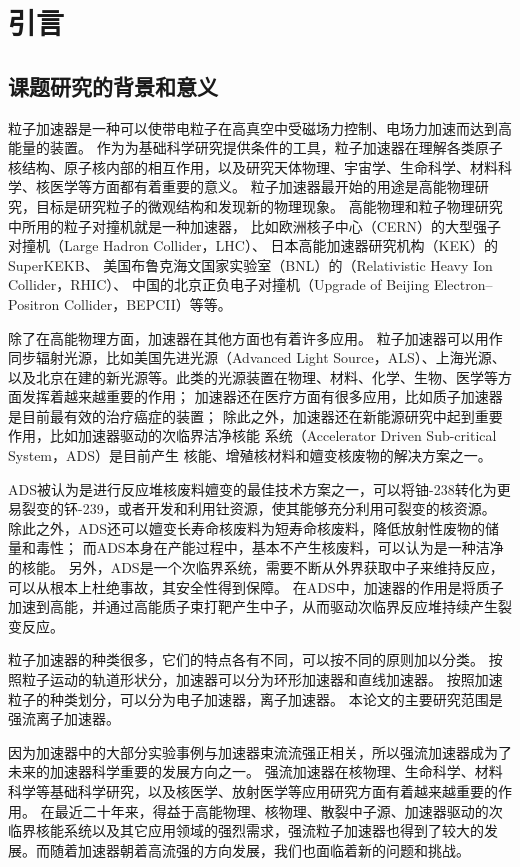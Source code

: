 
\chapter{引言}
\label{chap:Introduction}

\section{课题研究的背景和意义}  \label{section:background}
粒子加速器是一种可以使带电粒子在高真空中受磁场力控制、电场力加速而达到高能量的装置。
作为为基础科学研究提供条件的工具，粒子加速器在理解各类原子核结构、原子核内部的相互作用，以及研究天体物理、宇宙学、生命科学、材料科学、核医学等方面都有着重要的意义。
粒子加速器最开始的用途是高能物理研究，目标是研究粒子的微观结构和发现新的物理现象。
高能物理和粒子物理研究中所用的粒子对撞机就是一种加速器，
比如欧洲核子中心（CERN）的大型强子对撞机（Large Hadron Collider，LHC）、
日本高能加速器研究机构（KEK）的SuperKEKB、
美国布鲁克海文国家实验室（BNL）的（Relativistic Heavy Ion Collider，RHIC）、
中国的北京正负电子对撞机（Upgrade of Beijing Electron–Positron Collider，BEPCII）等等。

除了在高能物理方面，加速器在其他方面也有着许多应用。
粒子加速器可以用作同步辐射光源，比如美国先进光源（Advanced Light Source，ALS）、上海光源、
以及北京在建的新光源等。此类的光源装置在物理、材料、化学、生物、医学等方面发挥着越来越重要的作用；
加速器还在医疗方面有很多应用，比如质子加速器是目前最有效的治疗癌症的装置；
除此之外，加速器还在新能源研究中起到重要作用，比如加速器驱动的次临界洁净核能
系统（Accelerator Driven Sub-critical System，ADS）是目前产生
核能、增殖核材料和嬗变核废物的解决方案之一。

ADS被认为是进行反应堆核废料嬗变的最佳技术方案之一，可以将铀-238转化为更易裂变的钚-239，或者开发和利用钍资源，使其能够充分利用可裂变的核资源。
除此之外，ADS还可以嬗变长寿命核废料为短寿命核废料，降低放射性废物的储量和毒性；
而ADS本身在产能过程中，基本不产生核废料，可以认为是一种洁净的核能。
另外，ADS是一个次临界系统，需要不断从外界获取中子来维持反应，可以从根本上杜绝事故，其安全性得到保障。
在ADS中，加速器的作用是将质子加速到高能，并通过高能质子束打靶产生中子，从而驱动次临界反应堆持续产生裂变反应。

粒子加速器的种类很多，它们的特点各有不同，可以按不同的原则加以分类。
按照粒子运动的轨道形状分，加速器可以分为环形加速器和直线加速器。
按照加速粒子的种类划分，可以分为电子加速器，离子加速器。
本论文的主要研究范围是强流离子加速器。

因为加速器中的大部分实验事例与加速器束流流强正相关，所以强流加速器成为了未来的加速器科学重要的发展方向之一。
强流加速器在核物理、生命科学、材料科学等基础科学研究，以及核医学、放射医学等应用研究方面有着越来越重要的作用。
在最近二十年来，得益于高能物理、核物理、散裂中子源、加速器驱动的次临界核能系统以及其它应用领域的强烈需求，强流粒子加速器也得到了较大的发展\cite{wei2003synchrotrons,chou2002synchrotron}。而随着加速器朝着高流强的方向发展，我们也面临着新的问题和挑战。

